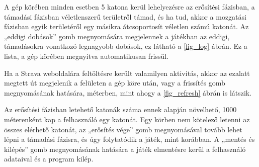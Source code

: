 

A gép körében minden esetben 5 katona kerül lehelyezésre az erősítési fázisban, a támadási fázisban véletlenszerű területről támad, és ha tud, akkor a mozgatási fázisban egyik területéről egy másikra átcsoportosít véletlen számú katonát. Az „eddigi dobások” gomb megnyomására megjelennek a játékban az eddigi, támadásokra vonatkozó legnagyobb dobások, ez látható a \ref{fig_log} ábrán. Ez a lista, a gép körében megnyitva automatikusan frissül. 



Ha a Strava weboldalára feltöltésre került valamilyen aktivitás, akkor az ezalatt megtett út megjelenik a felületen a gép köre után, vagy a frissítés gomb megnyomásának hatására, méterben, mint ahogy a \ref{fig_refresh} ábrán is látszik. 



Az erősítési fázisban letehető katonák száma ennek alapján növelhető, 1000 méterenként kap a felhasználó egy katonát. Egy körben nem kötelező letenni az összes elérhető katonát, az „erősítés vége” gomb megnyomásával tovább lehet lépni a támadási fázisra, és úgy folytatódik a játék, mint korábban. A „mentés és kilépés” gomb megnyomásának hatására a játék elmentésre kerül a felhasználó adataival és a program kilép. 